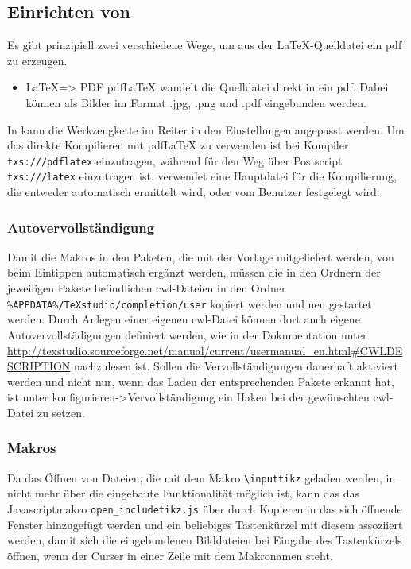 \subsection{Einrichten von \Texstudio}
Es gibt prinzipiell zwei verschiedene Wege, um aus der \LaTeX-Quelldatei ein pdf zu erzeugen.
\begin{itemize}
	\item \LaTeX => PDF pdf\LaTeX{} wandelt die Quelldatei direkt in ein pdf.
	Dabei können als Bilder im Format .jpg, .png und .pdf eingebunden werden.
\end{itemize}
In \Texstudio{} kann die Werkzeugkette im Reiter  in den Einstellungen angepasst werden.
Um das direkte Kompilieren mit pdf\LaTeX{} zu verwenden ist bei Kompiler \texttt{txs:///pdflatex} einzutragen, während für den Weg über Postscript \texttt{txs:///latex} einzutragen ist.
\Texstudio{} verwendet eine Hauptdatei für die Kompilierung, die entweder automatisch ermittelt wird, oder vom Benutzer festgelegt wird.

\subsubsection{Autovervollständigung}
Damit die Makros in den Paketen, die mit der Vorlage mitgeliefert werden, von \Texstudio{} beim Eintippen automatisch ergänzt werden, müssen die in den Ordnern der jeweiligen Pakete befindlichen cwl-Dateien in den Ordner \verb|%APPDATA%/TeXstudio/completion/user| kopiert werden und \Texstudio{} neu gestartet werden.
Durch Anlegen einer eigenen cwl-Datei können dort auch eigene Autovervollstädigungen definiert werden, wie in der Dokumentation unter \url{http://texstudio.sourceforge.net/manual/current/usermanual_en.html#CWLDESCRIPTION} nachzulesen ist.
Sollen die Vervollständigungen dauerhaft aktiviert werden und nicht nur, wenn \Texstudio{} das Laden der entsprechenden Pakete erkannt hat, ist unter \Texstudio{} konfigurieren->Vervollständigung ein Haken bei der gewünschten cwl-Datei zu setzen.

\subsubsection{Makros}
Da das Öffnen von Dateien, die mit dem Makro \texttt{\textbackslash{}inputtikz} geladen werden, in \Texstudio{} nicht mehr über die eingebaute Funktionalität möglich ist, kann das das Javascriptmakro \texttt{open\_includetikz.js} über  durch Kopieren in das sich öffnende Fenster hinzugefügt werden und ein beliebiges Tastenkürzel mit diesem assoziiert werden, damit sich die eingebundenen Bilddateien bei Eingabe des Tastenkürzels öffnen, wenn der Curser in einer Zeile mit dem Makronamen steht.



